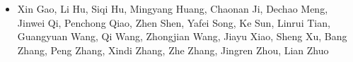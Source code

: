 \documentclass{article} %
\begin{document}
\begin{itemize}[nosep,label={},leftmargin=*]
    \bfseries
    \color{blue}
    \item Xin Gao, Li Hu, Siqi Hu, Mingyang Huang, Chaonan Ji, Dechao Meng, Jinwei Qi, Penchong Qiao, Zhen Shen, Yafei Song, Ke Sun, Linrui Tian, Guangyuan Wang, Qi Wang, Zhongjian Wang, Jiayu Xiao, Sheng Xu, Bang Zhang, Peng Zhang, Xindi Zhang, Zhe Zhang, Jingren Zhou, Lian Zhuo
    
\end{itemize}


\FloatBarrier







\end{document}
